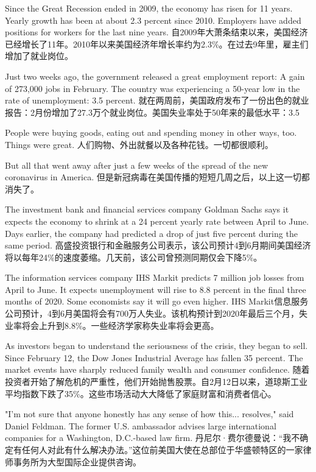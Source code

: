 Since the Great Recession ended in 2009, the economy has risen for 11 years. Yearly growth has been at about 2.3 percent since 2010. Employers have added positions for workers for the last nine years.
自2009年大萧条结束以来，美国经济已经增长了11年。2010年以来美国经济年增长率约为2.3\%。在过去9年里，雇主们增加了就业岗位。

Just two weeks ago, the government released a great employment report: A gain of 273,000 jobs in February. The country was experiencing a 50-year low in the rate of unemployment: 3.5 percent.
就在两周前，美国政府发布了一份出色的就业报告：2月份增加了27.3万个就业岗位。美国失业率处于50年来的最低水平：3.5%

People were buying goods, eating out and spending money in other ways, too. Things were great.
人们购物、外出就餐以及各种花钱。一切都很顺利。

But all that went away after just a few weeks of the spread of the new coronavirus in America.
但是新冠病毒在美国传播的短短几周之后，以上这一切都消失了。


 
The investment bank and financial services company Goldman Sachs says it expects the economy to shrink at a 24 percent yearly rate between April to June. Days earlier, the company had predicted a drop of just five percent during the same period.
高盛投资银行和金融服务公司表示，该公司预计4到6月期间美国经济将以每年24\%的速度萎缩。几天前，该公司曾预测同期仅会下降5\%。

The information services company IHS Markit predicts 7 million job losses from April to June. It expects unemployment will rise to 8.8 percent in the final three months of 2020. Some economists say it will go even higher.
IHS Markit信息服务公司预计，4到6月美国将会有700万人失业。该机构预计到2020年最后三个月，失业率将会上升到8.8\%。一些经济学家称失业率将会更高。

As investors began to understand the seriousness of the crisis, they began to sell. Since February 12, the Dow Jones Industrial Average has fallen 35 percent. The market events have sharply reduced family wealth and consumer confidence.
随着投资者开始了解危机的严重性，他们开始抛售股票。自2月12日以来，道琼斯工业平均指数下跌了35\%。这些市场活动大大降低了家庭财富和消费者信心。

"I'm not sure that anyone honestly has any sense of how this... resolves," said Daniel Feldman. The former U.S. ambassador advises large international companies for a Washington, D.C.-based law firm.
丹尼尔·费尔德曼说：“我不确定有任何人对此有什么解决办法。”这位前美国大使在总部位于华盛顿特区的一家律师事务所为大型国际企业提供咨询。

